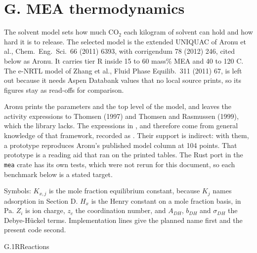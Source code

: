 \section{G. MEA thermodynamics}\label{sec:G}
The solvent model sets how much CO$_2$ each kilogram of solvent can hold and how hard it is to release. The selected model is the extended UNIQUAC of Aronu et al., Chem.\ Eng.\ Sci.\ 66 (2011) 6393, with corrigendum 78 (2012) 246, cited below as Aronu. It carries tier R inside 15 to 60 mass\% MEA and 40 to 120 C. The e-NRTL model of Zhang et al., Fluid Phase Equilib.\ 311 (2011) 67, is left out because it needs Aspen Databank values that no local source prints, so its figures stay as read-offs for comparison.

Aronu prints the parameters and the top level of the model, and leaves the activity expressions to Thomsen (1997) and Thomsen and Rasmussen (1999), which the library lacks. The expressions in ,  and  therefore come from general knowledge of that framework, recorded as . Their support is indirect: with them, a prototype reproduces Aronu's published model column at 104 points. That prototype is a reading aid that ran on the printed tables. The Rust port in the \texttt{mea} crate has its own tests, which were not rerun for this document, so each benchmark below is a stated target.

Symbols: $K_{x,j}$ is the mole fraction equilibrium constant, because $K_j$ names adsorption in Section D. $H_x$ is the Henry constant on a mole fraction basis, in Pa. $Z_i$ is ion charge, $z_c$ the coordination number, and $A_{DH}$, $b_{DH}$ and $\sigma_{DH}$ the Debye-H\"uckel terms. Implementation lines give the planned name first and the present code second.

\begin{eqcard}{G.1}{R}{Reactions}
\end{eqcard}

